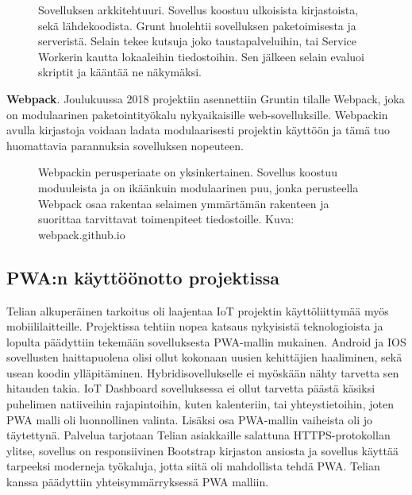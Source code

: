 \documentclass{tktltiki}
\begin{document}
\begin{figure}[h]
\begin{center}
\caption{Sovelluksen arkkitehtuuri. Sovellus koostuu ulkoisista kirjastoista, sekä lähdekoodista. Grunt huolehtii sovelluksen paketoimisesta ja serveristä. Selain tekee kutsuja joko taustapalveluihin, tai Service Workerin kautta lokaaleihin tiedostoihin. Sen jälkeen selain evaluoi skriptit ja kääntää ne näkymäksi.}
\label{angulararkkitehtuuri}
\end{center}
\end{figure}

\textbf{Webpack}. Joulukuussa 2018 projektiin asennettiin Gruntin tilalle Webpack, joka on modulaarinen paketointityökalu nykyaikaisille web-sovelluksille. Webpackin avulla kirjastoja voidaan ladata modulaarisesti projektin käyttöön ja tämä tuo huomattavia parannuksia sovelluksen nopeuteen. 

\begin{figure}[h]
\begin{center}
\caption{Webpackin perusperiaate on yksinkertainen. Sovellus koostuu moduuleista ja on ikäänkuin modulaarinen puu, jonka perusteella Webpack osaa rakentaa selaimen ymmärtämän rakenteen ja suorittaa tarvittavat toimenpiteet tiedostoille. Kuva: webpack.github.io}
\label{whatiswebpack}
\end{center}
\end{figure}



\subsection{PWA:n käyttöönotto projektissa}

Telian alkuperäinen tarkoitus oli laajentaa IoT projektin käyttöliittymää myös mobiililaitteille. Projektissa tehtiin nopea katsaus nykyisistä teknologioista ja lopulta päädyttiin tekemään sovelluksesta PWA-mallin mukainen. Android ja IOS sovellusten haittapuolena olisi ollut kokonaan uusien kehittäjien haaliminen, sekä usean koodin ylläpitäminen. Hybridisovellukselle ei myöskään nähty tarvetta sen hitauden takia. IoT Dashboard sovelluksessa ei ollut tarvetta päästä käsiksi puhelimen natiiveihin rajapintoihin, kuten kalenteriin, tai yhteystietoihin, joten PWA malli oli luonnollinen valinta. Lisäksi osa PWA-mallin vaiheista oli jo täytettynä. Palvelua tarjotaan Telian asiakkaille salattuna HTTPS-protokollan ylitse, sovellus on responsiivinen Bootstrap kirjaston ansiosta ja sovellus käyttää tarpeeksi moderneja työkaluja, jotta siitä oli mahdollista tehdä PWA. Telian kanssa päädyttiin yhteisymmärryksessä PWA malliin. 
\end{document}
